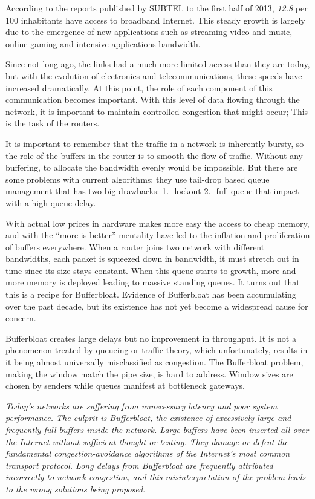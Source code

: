 According to the reports published by SUBTEL to the first half of 2013,
\textit{12.8} per 100 inhabitants have access to broadband
Internet\cite{OCDE}.  This steady growth is largely due to the emergence of
new applications such as streaming video and music, online gaming and
intensive applications bandwidth.

Since not long ago, the links had a much more limited access than they are
today, but with the evolution of electronics and telecommunications, these
speeds have increased dramatically. At this point, the role of each component
of this communication becomes important. With this level of data flowing
through the network, it is important to maintain controlled congestion that
might occur; This is the task of the routers.

It is important to remember that the traffic in a network is inherently
bursty, so the role of the buffers in the router is to smooth the flow of
traffic. Without any buffering, to allocate the bandwidth evenly would be
impossible. But there are some problems with current algorithms; they use
tail-drop based queue management that has two big drawbacks: 1.- lockout 2.-
full queue that impact with a high queue delay.

With actual low prices in hardware makes more easy the access to cheap memory,
and with the ``more is better'' mentality have led to the inflation and
proliferation of buffers everywhere\cite{NicholsJacobsonCQD}. When a router
joins two network with different bandwidths, each packet is squeezed down in
bandwidth, it must stretch out in time since its size stays constant. When
this queue starts to growth, more and more memory is deployed leading to
massive standing queues. It turns out that this is a recipe for Bufferbloat.
Evidence of Bufferbloat has been accumulating over the past decade, but its
existence has not yet become a widespread cause for concern.

Bufferbloat creates large delays but no improvement in throughput. It is not a
phenomenon treated by queueing or traffic theory, which unfortunately, results
in it being almost universally misclassified as congestion. The Bufferbloat
problem, making the window match the pipe size, is hard to address. Window
sizes are chosen by senders while queues manifest at bottleneck gateways.

\textit{Today's networks are suffering from unnecessary latency and poor
system performance. The culprit is Bufferbloat, the existence of excessively
large and frequently full buffers inside the network. Large buffers have been
inserted all over the Internet without sufficient thought or testing. They
damage or defeat the fundamental congestion-avoidance algorithms of the
Internet's most common transport protocol. Long delays from Bufferbloat are
frequently attributed incorrectly to network congestion, and this
misinterpretation of the problem leads to the wrong solutions being
proposed}\cite{GettysNichols}.

